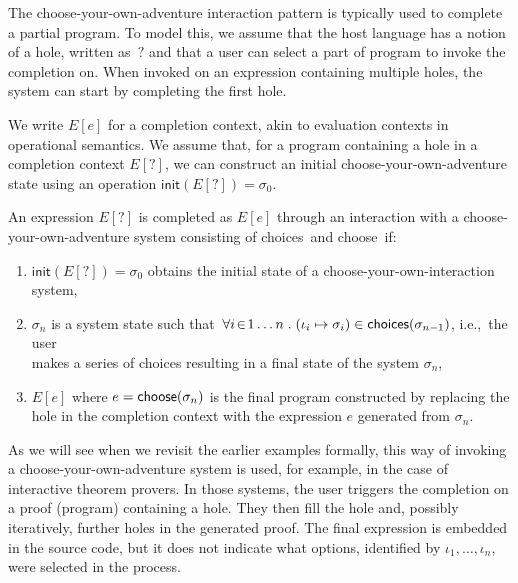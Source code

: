 \documentclass[ a4paper,UKenglish,cleveref, autoref, thm-restate]{lipics-v2021}
\newcommand{\ident}[1]{\textsf{#1}}
\newcommand{\sigmaN}{\sigma_0}
\newcommand{\select}{\textnormal{\ident{choose}}}
\newcommand{\choices}{\textnormal{\ident{choices}}}
\begin{document}
The choose-your-own-adventure interaction pattern is typically used to complete a partial program.
To model this, we assume that the host language has a notion of a hole, written as~$?$
and that a user can select a part of program to invoke the completion on. When invoked on
an expression containing multiple holes, the system can start by completing the first hole.

We write $E[e]$ for a completion context, akin to evaluation contexts in operational semantics.
We assume that, for a program containing a hole in a completion context $E[?]$, we can construct
an initial choose-your-own-adventure state using an operation $\ident{init}(E[?])=\sigmaN$.

\begin{definition}
An expression $E[?]$ is completed as $E[e]$ through an interaction with
a choose-your-own-adventure system consisting of \choices\ and \select\ if:

\vspace{-0.5em}
\raggedright
\begin{enumerate}
\item $\ident{init}(E[?]) = \sigmaN$ obtains the initial state of a choose-your-own-interaction system,
\item $\sigma_n$ is a system state such that $\,\forall i\!\in\! 1\ldots n\;.\;(\iota_i\mapsto\sigma_i)\in\choices{(\sigma_{n-1})}$,
  i.e.,~the user\\ makes a series of choices resulting in a final state of the system $\sigma_n$,
\item $E[e]$ where $e=\select(\sigma_n)$ is the final program constructed by replacing the hole
  in the completion context with the expression $e$ generated from $\sigma_n$.
\end{enumerate}
\end{definition}

As we will see when we revisit the earlier examples formally, this way of invoking a choose-your-own-adventure
system is used, for example, in the case of interactive theorem provers.
In those systems, the user triggers the completion on a proof (program) containing a hole.
They then fill the hole and, possibly iteratively, further holes in the generated proof. The final
expression is embedded in the source code, but it does not indicate what options, identified by
$\iota_1, \ldots, \iota_n$, were selected in the process.

\end{document}
